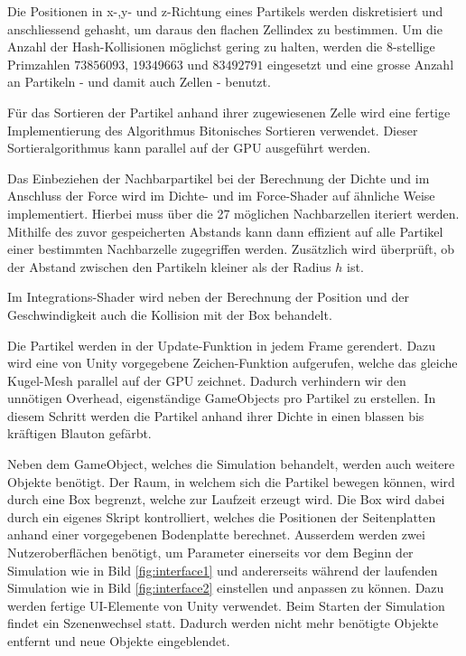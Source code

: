 \documentclass[a4paper]{paper}
\begin{document}
Die Positionen in x-,y- und z-Richtung eines Partikels werden diskretisiert und anschliessend gehasht, um daraus den flachen Zellindex zu bestimmen. Um die Anzahl der Hash-Kollisionen möglichst gering zu halten, werden die 8-stellige Primzahlen $73856093$, $19349663$ und $83492791$ eingesetzt und eine grosse Anzahl an Partikeln - und damit auch Zellen - benutzt.

Für das Sortieren der Partikel anhand ihrer zugewiesenen Zelle wird eine fertige Implementierung des Algorithmus Bitonisches Sortieren verwendet. Dieser Sortieralgorithmus kann parallel auf der GPU ausgeführt werden.

Das Einbeziehen der Nachbarpartikel bei der Berechnung der Dichte und im Anschluss der Force wird im Dichte- und im Force-Shader auf ähnliche Weise implementiert. Hierbei muss über die 27 möglichen Nachbarzellen iteriert werden. Mithilfe des zuvor gespeicherten Abstands kann dann effizient auf alle Partikel einer bestimmten Nachbarzelle zugegriffen werden. Zusätzlich wird überprüft, ob der Abstand zwischen den Partikeln kleiner als der Radius $h$ ist.

Im Integrations-Shader wird neben der Berechnung der Position und der Geschwindigkeit auch die Kollision mit der Box behandelt.

Die Partikel werden in der Update-Funktion in jedem Frame gerendert. Dazu wird eine von Unity vorgegebene Zeichen-Funktion aufgerufen, welche das gleiche Kugel-Mesh parallel auf der GPU zeichnet. Dadurch verhindern wir den unnötigen Overhead, eigenständige GameObjects pro Partikel zu erstellen. In diesem Schritt werden die Partikel anhand ihrer Dichte in einen blassen bis kräftigen Blauton gefärbt.

Neben dem GameObject, welches die Simulation behandelt, werden auch weitere Objekte benötigt. Der Raum, in welchem sich die Partikel bewegen können, wird durch eine Box begrenzt, welche zur Laufzeit erzeugt wird. Die Box wird dabei durch ein eigenes Skript kontrolliert, welches die Positionen der Seitenplatten anhand einer vorgegebenen Bodenplatte berechnet.
Ausserdem werden zwei Nutzeroberflächen benötigt, um Parameter einerseits vor dem Beginn der Simulation wie in Bild \ref{fig:interface1} und andererseits während der laufenden Simulation wie in Bild \ref{fig:interface2} einstellen und anpassen zu können. Dazu werden fertige UI-Elemente von Unity verwendet. Beim Starten der Simulation findet ein Szenenwechsel statt. Dadurch werden nicht mehr benötigte Objekte entfernt und neue Objekte eingeblendet.
\end{document}

